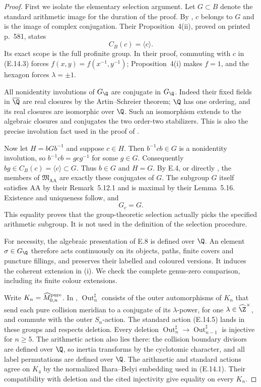 \begin{proof}
First we isolate the elementary selection argument. Let $G\subset B$
denote the standard arithmetic image for the duration of the proof.
By \citet[Theorem~1]{E_LochakSchneps1997}, $c$ belongs to $G$ and
is the image of complex conjugation. Their Proposition~4(ii), proved
on printed p.~581, states
\[
                         C_B(c)=\langle c\rangle.             \tag{E.14.6}
\]
Its exact scope is the full profinite group. In their proof, commuting
with $c$ in (E.14.3) forces $f(x,y)=f(x^{-1},y^{-1})$;
Proposition~4(i) makes $f=1$, and the hexagon forces $\lambda=\pm1$.

All nonidentity involutions of $G_\Q$ are conjugate in $G_\Q$.
Indeed their fixed fields in $\overline\Q$ are real closures by the
Artin--Schreier theorem; $\Q$ has one ordering, and its real closures
are isomorphic over $\Q$. Such an isomorphism extends to the algebraic
closures and conjugates the two order-two stabilizers. This is also
the precise involution fact used in the proof of
\citet[Proposition~4(iii), p.~581]{E_LochakSchneps1997}.

Now let $H=bGb^{-1}$ and suppose $c\in H$. Then $b^{-1}cb\in G$
is a nonidentity involution, so $b^{-1}cb=g c g^{-1}$ for some
$g\in G$. Consequently $bg\in C_B(c)=\langle c\rangle\subset G$.
Thus $b\in G$ and $H=G$. By E.4, or directly
\citet[Theorem~5.17(ii)]{E_HMT2025}, the members of
$\mathfrak M_{\mathrm{AA}}$ are exactly these conjugates of $G$.
The subgroup $G$ itself satisfies AA by their Remark~5.12.1 and is
maximal by their Lemma~5.16. Existence and uniqueness follow, and
\[
                              G_c=G.                          \tag{E.14.7}
\]
This equality proves that the group-theoretic selection actually picks
the specified arithmetic subgroup. It is not used in the definition
of the selection procedure.

For necessity, the algebraic presentation of E.8 is defined over
$\Q$. An element $\sigma\in G_\Q$ therefore acts continuously
on its objects, paths, finite covers and puncture fillings, and
preserves their labelled and coloured versions. It induces the
coherent extension in (i). We check the complete genus-zero
comparison, including its finite colour extensions.

Write $K_n=\widehat M_{0,n}^{\rm pure}$. In
\citet[\S0.1, Definition; \S3.1, Proposition~8, Lemma~1 and
Theorem~5, author pp.~2, 29--31]{E_HarbaterSchneps2000},
$\operatorname{Out}^{\sharp}_n$ consists of the outer automorphisms
of $K_n$ that send each pure collision meridian to a conjugate of
its $\lambda$-power, for one $\lambda\in\widehat\Z^\times$, and
commute with the outer $S_n$-action. The standard action (E.14.5)
lands in these groups and respects deletion. Every deletion
$\operatorname{Out}^{\sharp}_n\to
\operatorname{Out}^{\sharp}_{n-1}$ is injective for $n\ge5$.
The arithmetic action also lies there: the collision boundary divisors
are defined over $\Q$, so inertia transforms by the cyclotomic
character, and all label permutations are defined over $\Q$.
The arithmetic and standard actions agree on $K_4$ by the normalized
Ihara--Belyi embedding used in (E.14.1). Their compatibility with
deletion and the cited injectivity give equality on every $K_n$.


\end{proof}

